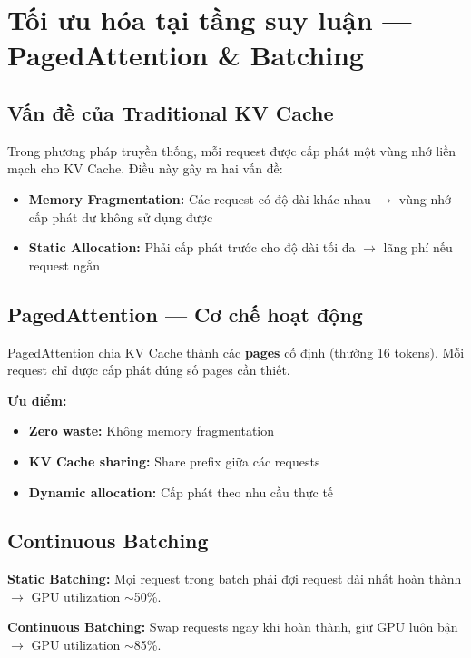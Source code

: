 \documentclass[12pt,a4paper]{report}
\begin{document}
\section{Tối ưu hóa tại tầng suy luận --- PagedAttention \& Batching}

\subsection{Vấn đề của Traditional KV Cache}

Trong phương pháp truyền thống, mỗi request được cấp phát một vùng nhớ liền mạch cho KV Cache. Điều này gây ra hai vấn đề:
\begin{itemize}
  \item \textbf{Memory Fragmentation:} Các request có độ dài khác nhau $\rightarrow$ vùng nhớ cấp phát dư không sử dụng được
  \item \textbf{Static Allocation:} Phải cấp phát trước cho độ dài tối đa $\rightarrow$ lãng phí nếu request ngắn
\end{itemize}

\subsection{PagedAttention --- Cơ chế hoạt động}

PagedAttention chia KV Cache thành các \textbf{pages} cố định (thường 16 tokens). Mỗi request chỉ được cấp phát đúng số pages cần thiết.

\textbf{Ưu điểm:}
\begin{itemize}
  \item \textbf{Zero waste:} Không memory fragmentation
  \item \textbf{KV Cache sharing:} Share prefix giữa các requests
  \item \textbf{Dynamic allocation:} Cấp phát theo nhu cầu thực tế
\end{itemize}

\subsection{Continuous Batching}

\textbf{Static Batching:} Mọi request trong batch phải đợi request dài nhất hoàn thành $\rightarrow$ GPU utilization $\sim$50\%.

\textbf{Continuous Batching:} Swap requests ngay khi hoàn thành, giữ GPU luôn bận $\rightarrow$ GPU utilization $\sim$85\%.
\end{document}
